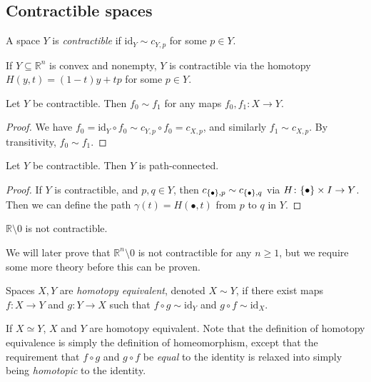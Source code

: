 \subsection{Contractible spaces}
\begin{definition}
	A space \( Y \) is \emph{contractible} if \( \mathrm{id}_Y \sim c_{Y,p} \) for some \( p \in Y \).
\end{definition}
\begin{example}
	If \( Y \subseteq \mathbb R^n \) is convex and nonempty, \( Y \) is contractible via the homotopy \( H(y,t) = (1-t)y + tp \) for some \( p \in Y \).
\end{example}
\begin{proposition}
	Let \( Y \) be contractible.
	Then \( f_0 \sim f_1 \) for any maps \( f_0, f_1 \colon X \to Y \).
\end{proposition}
\begin{proof}
	We have \( f_0 = \mathrm{id}_Y \circ f_0 \sim c_{Y,p} \circ f_0 = c_{X,p} \), and similarly \( f_1 \sim c_{X,p} \).
	By transitivity, \( f_0 \sim f_1 \).
\end{proof}
\begin{corollary}
	Let \( Y \) be contractible.
	Then \( Y \) is path-connected.
\end{corollary}
\begin{proof}
	If \( Y \) is contractible, and \( p, q \in Y \), then \( c_{\qty{\bullet},p} \sim c_{\qty{\bullet},q} \) via \( H \colon \qty{\bullet} \times I \to Y \).
	Then we can define the path \( \gamma(t) = H(\bullet,t) \) from \( p \) to \( q \) in \( Y \).
\end{proof}
\begin{example}
	\( \mathbb R \setminus \qty{0} \) is not contractible.
\end{example}
We will later prove that \( \mathbb R^n \setminus \qty{0} \) is not contractible for any \( n \geq 1 \), but we require some more theory before this can be proven.
\begin{definition}
	Spaces \( X, Y \) are \emph{homotopy equivalent}, denoted \( X \sim Y \), if there exist maps \( f \colon X \to Y \) and \( g \colon Y \to X \) such that \( f \circ g \sim \mathrm{id}_Y \) and \( g \circ f \sim \mathrm{id}_X \).
\end{definition}
\begin{example}
	If \( X \simeq Y \), \( X \) and \( Y \) are homotopy equivalent.
	Note that the definition of homotopy equivalence is simply the definition of homeomorphism, except that the requirement that \( f \circ g \) and \( g \circ f \) be \emph{equal} to the identity is relaxed into simply being \emph{homotopic} to the identity.
\end{example}
